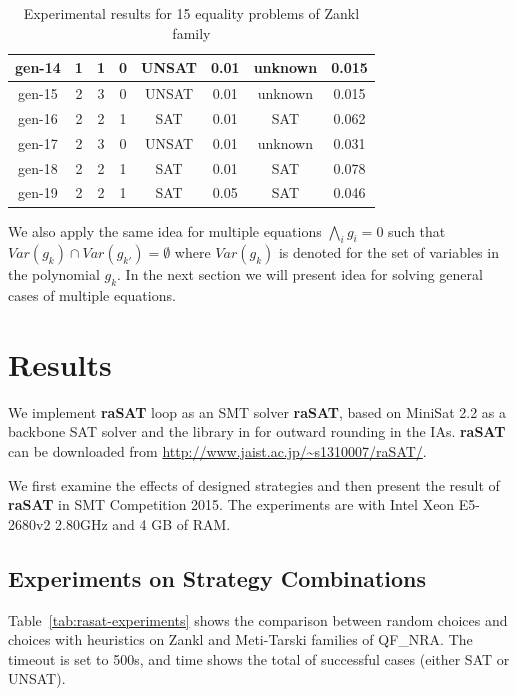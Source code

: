 \documentclass[runningheads,a4paper,oribibl]{llncs}
\begin{document}
{{\begin{table}
{\begin{tabular}[b]{|c|c|c|c|c|c|c|c|}
\hline
gen-14 & 1 & 1 & 0& UNSAT &0.01 & unknown &0.015\\
\hline
gen-15 & 2 & 3 & 0& UNSAT &0.01 & unknown &0.015\\
\hline
gen-16 & 2 & 2 & 1& SAT &0.01 & SAT &0.062\\
\hline
gen-17 & 2 & 3 & 0& UNSAT &0.01 & unknown &0.031\\
\hline
gen-18 & 2 & 2 & 1& SAT &0.01 & SAT &0.078\\
\hline
gen-19 & 2 & 2 & 1& SAT &0.05 & SAT &0.046\\
\hline
\end{tabular}
}
\caption{Experimental results for 15 equality problems of Zankl family}
\label{tab:eqexp}
\end{table}

We also apply the same idea for multiple equations $\bigwedge \limits_{i} g_i = 0$ such that $Var(g_k) \cap Var(g_{k'}) = \emptyset$ where $Var(g_k)$ is denoted for the set of variables in the polynomial $g_k$. In the next section we will present idea for solving general cases of multiple equations.
}

}

\section{Results} \label{sec:experiment}

We implement \textbf{raSAT} loop as an SMT solver {\bf raSAT}, 
based on MiniSat 2.2 as a backbone SAT solver and the library in \cite{Al2012.14} for
outward rounding in the IAs. \textbf{raSAT} can be downloaded from \url{http://www.jaist.ac.jp/~s1310007/raSAT/}.

We first examine the effects of designed strategies and then present the result of \textbf{raSAT} in SMT Competition 2015.
The experiments are with Intel Xeon E5-2680v2 2.80GHz and 4 GB of RAM. 

\subsection{Experiments on Strategy Combinations} \label{sec:expstrategy}


Table~\ref{tab:rasat-experiments} shows the comparison between random choices and choices with heuristics
on Zankl and Meti-Tarski families of QF\_NRA. 
The timeout is set to 500s, and time shows the total of successful cases 
(either SAT or UNSAT). %
\end{document}
